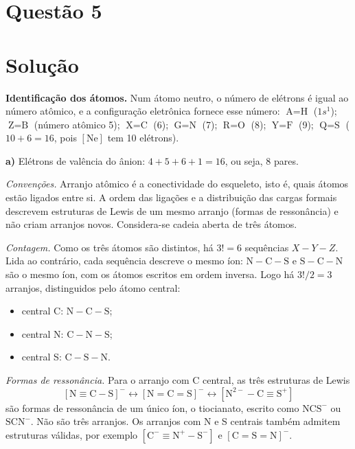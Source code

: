 \documentclass{article}%
\begin{document}
\section*{Questão 5}

\section*{Solução}

\noindent\textbf{Identificação dos átomos.} Num átomo neutro, o número de elétrons é igual ao número atômico, e a configuração eletrônica fornece esse número:
$\text{A}=\text{H}$ ($1s^1$); $\text{Z}=\text{B}$ (número atômico 5); $\text{X}=\text{C}$ (6); $\text{G}=\text{N}$ (7); $\text{R}=\text{O}$ (8); $\text{Y}=\text{F}$ (9); $\text{Q}=\text{S}$ ($10+6=16$, pois $[\text{Ne}]$ tem 10 elétrons).

\medskip
\noindent\textbf{a)} Elétrons de valência do ânion: $4+5+6+1=16$, ou seja, 8 pares.

\noindent\emph{Convenções.} Arranjo atômico é a conectividade do esqueleto, isto é, quais átomos estão ligados entre si. A ordem das ligações e a distribuição das cargas formais descrevem estruturas de Lewis de um mesmo arranjo (formas de ressonância) e não criam arranjos novos. Considera-se cadeia aberta de três átomos.

\noindent\emph{Contagem.} Como os três átomos são distintos, há $3!=6$ sequências $X{-}Y{-}Z$. Lida ao contrário, cada sequência descreve o mesmo íon: $\text{N}{-}\text{C}{-}\text{S}$ e $\text{S}{-}\text{C}{-}\text{N}$ são o mesmo íon, com os átomos escritos em ordem inversa. Logo há $3!/2=3$ arranjos, distinguidos pelo átomo central:
\begin{itemize}
\item central C: $\text{N}{-}\text{C}{-}\text{S}$;
\item central N: $\text{C}{-}\text{N}{-}\text{S}$;
\item central S: $\text{C}{-}\text{S}{-}\text{N}$.
\end{itemize}

\noindent\emph{Formas de ressonância.} Para o arranjo com C central, as três estruturas de Lewis
\[
[\text{N}{\equiv}\text{C}{-}\text{S}]^{-}\leftrightarrow[\text{N}{=}\text{C}{=}\text{S}]^{-}\leftrightarrow[\text{N}^{2-}{-}\text{C}{\equiv}\text{S}^{+}]
\]
são formas de ressonância de um único íon, o tiocianato, escrito como $\text{NCS}^{-}$ ou $\text{SCN}^{-}$. Não são três arranjos. Os arranjos com N e S centrais também admitem estruturas válidas, por exemplo $[\text{C}^{-}{\equiv}\text{N}^{+}{-}\text{S}^{-}]$ e $[\text{C}{=}\text{S}{=}\text{N}]^{-}$.
\end{document}

